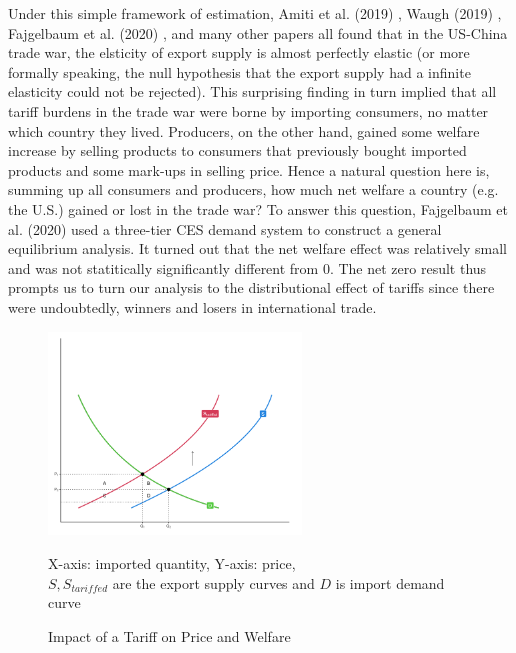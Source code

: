 \documentclass[12pt]{article}
\begin{document}
Under this simple framework of estimation, Amiti et al. (2019) \cite{amiti2019impact}, Waugh (2019) \cite{waugh2019consumption}, Fajgelbaum et al. (2020) \cite{fajgelbaum2020return}, 
and many other papers all found that in the US-China trade war, the elsticity of export supply is almost perfectly elastic 
(or more formally speaking, the null hypothesis that the export supply had a infinite elasticity could not be rejected). 
This surprising finding in turn implied that all tariff burdens in the trade war were borne by importing consumers, no matter which country they lived. 
Producers, on the other hand, gained some welfare increase by selling products to consumers that previously bought imported products and some mark-ups in selling price.
Hence a natural question here is, summing up all consumers and producers, how much net welfare a country (e.g. the U.S.) gained or lost in the trade war?
To answer this question, Fajgelbaum et al. (2020) \cite{fajgelbaum2020return} used a three-tier CES demand system to construct a general equilibrium analysis. 
It turned out that the net welfare effect was relatively small and was not statitically significantly different from 0. 
The net zero result thus prompts us to turn our analysis to the distributional effect of tariffs since there were undoubtedly, winners and losers in international trade.

\begin{figure}[H]
    \centering
    \includegraphics[width = 0.6\textwidth]{tariff_welfare.png}
    \caption{Impact of a Tariff on Price and Welfare}
    {\footnotesize X-axis: imported quantity, Y-axis: price, \\ 
    $S, S_{tariffed}$ are the export supply curves and $D$ is import demand curve \par}
    \label{tariff_welfare}
\end{figure}
\end{document}

